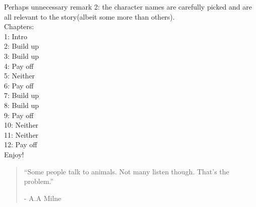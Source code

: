 \documentclass[smalldemyvopaper,11pt,twoside,onecolumn,openright,extrafontsizes]{memoir}
\begin{document}
Perhaps unnecessary remark 2: the character names are carefully picked and are all relevant to the story(albeit some more than others).\\[1cm]
Chapters:\\
1: Intro\\
2: Build up\\
3: Build up\\
4: Pay off\\
5: Neither\\
6: Pay off\\
7: Build up\\
8: Build up\\
9: Pay off\\
10: Neither\\
11: Neither\\
12: Pay off\\





Enjoy!



\clearpage
\tableofcontents*

\clearpage


	

\clearpage

\vspace*{4.3cm}
\begin{localsize}{10}
  \begin{quote}
    “Some people talk to animals. Not many listen though. That's the problem.”
    \begin{flushright}- A.A Milne \end{flushright}
  \end{quote} 
\end{localsize}
\vspace{1cm}
\end{document}
